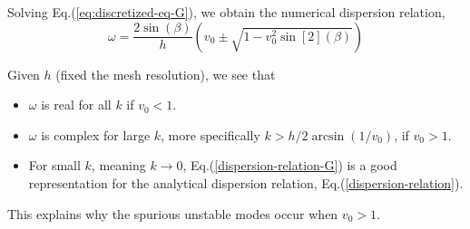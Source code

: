 Solving Eq.(\ref{eq:discretized-eq-G}), we obtain the numerical dispersion relation,
\begin{equation} \label{dispersion-relation-G}
	\omega = \frac{2\sin(\beta)}{h}\left(v_0 \pm \sqrt{1 - v_0^2\sin[2](\beta)}\right)
\end{equation}

Given $h$ (fixed the mesh resolution), we see that
\begin{itemize}
	\item $\omega$ is real for all $k$ if $v_0 < 1$.
	\item $\omega$ is complex for large $k$, more specifically $k>h/2\arcsin(1/v_0)$, if $v_0 > 1$.
	\item For small $k$, meaning $k\to 0$, Eq.(\ref{dispersion-relation-G}) is a good representation for the analytical dispersion relation, Eq.(\ref{dispersion-relation}). 
\end{itemize}
This explains why the spurious unstable modes occur when $v_0>1$.

